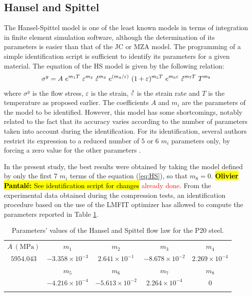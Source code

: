 \documentclass[twoside,english,1p,final,sort&compress]{elsarticle}
\theoremstyle{plain}
\newcommand{\mdot}[1]{\accentset{\mbox{\bfseries .}}{#1}}
\DeclareRobustCommand{\OP}[1]{ {\begingroup\sethlcolor{VWyellow}\textcolor{red}{\hl{\textbf{Olivier Pantal\'e:} #1}}\endgroup} }
\begin{document}
\subsection{Hansel and Spittel\label{sec:HSmodel}}

The Hansel-Spittel model \cite{Hensel-1978} is one of the least known models in terms of integration in finite element simulation software, although the determination of its parameters is easier than that of the JC or MZA model. 
The programming of a simple identification script is sufficient to identify its parameters for a given material. 
The equation of the HS model is given by the following relation:
\begin{equation}
\sigma^y = A~e^{m_1T}~\varepsilon^{m_2}~\mdot\varepsilon^{m_3}~e^{({m_4}/{\varepsilon})}~(1+\varepsilon)^{m_5T}~e^{m_6\varepsilon}~\mdot\varepsilon^{m_7T}~T^{m_8}\label{eq:HS}
\end{equation}
where $\sigma^y$ is the flow stress, $\varepsilon$ is the strain, $\mdot\varepsilon$ is the strain rate and $T$ is the temperature as proposed earlier. 
The coefficients $A$ and $m_i$ are the parameters of the model to be identified. 
However, this model has some shortcomings, notably related to the fact that its accuracy varies according to the number of parameters taken into account during the identification. 
For its identification, several authors restrict its expression to a reduced number of $5$ or $6$ $m_i$ parameters only, by forcing a zero value for the other parameters \cite{Chadha-2018, Rudnytskyj-2020, Mehtedi-2015}. 

In the present study, the best results were obtained by taking the model defined by only the first $7$ $m_i$ terms of the equation (\ref{eq:HS}), so that $m_8=0$.\OP{See identification script for changes}\textcolor{red}{already done}.
From the experimental data obtained during the compression tests, an identification procedure based on the use of the LMFIT optimizer \cite{Newville-2016} has allowed to compute the parameters reported in Table \ref{tab: HSparameters}. 
\begin{table}[h!]
\centering
\caption{Parameters' values of the Hansel and Spittel flow law for the P20 steel.}
\begin{tabular}{ccccc}
\hline
$A~(\text{MPa})$ & $m_1$ & $m_2$ & $m_3$ & $m_4$\\
$5954.043$ & $-3.358\times10^{-3}$ & $2.641\times10^{-1}$ & $-8.678\times10^{-2}$ & $2.269\times10^{-4}$\\\hline
& $m_5$ & $m_6$ & $m_7$ & $m_8$\\
& $-4.216\times10^{-4}$ & $-5.613\times10^{-2}$ & $2.264\times10^{-4}$ & $0$\\\hline
\label{tab: HSparameters}
\end{tabular}
\end{table}
\end{document}
